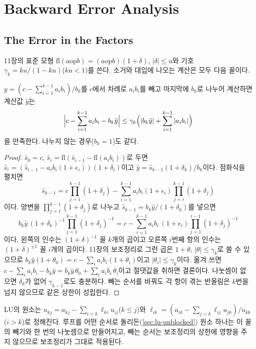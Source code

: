 \section{Backward Error Analysis}
\label{sec:lu-backward-error}

\subsection{The Error in the Factors}

11장의 표준 모형 $\mathrm{fl}(a\mathbin{\mathrm{op}}b)=(a\mathbin{\mathrm{op}}b)(1+\delta)$, $|\delta|\le u$와 기호 $\gamma_k=ku/(1-ku)$($ku<1$)를 쓴다. 소거와 대입에 나오는 계산은 모두 다음 꼴이다.

\begin{lemma}
\label{lem:lu-recurrence}
$y=(c-\sum_{i=1}^{k-1}a_ib_i)/b_k$를 $c$에서 차례로 $a_ib_i$를 빼고 마지막에 $b_k$로 나누어 계산하면 계산값 $\hat y$는
\[
\Bigl|c-\sum_{i=1}^{k-1}a_ib_i-b_k\hat y\Bigr|\le\gamma_k\Bigl(|b_k\hat y|+\sum_{i=1}^{k-1}|a_ib_i|\Bigr)
\]
을 만족한다. 나누지 않는 경우($b_k=1$)도 같다.
\end{lemma}

\begin{proof}
$\hat s_0=c$, $\hat s_i=\mathrm{fl}(\hat s_{i-1}-\mathrm{fl}(a_ib_i))$로 두면 $\hat s_i=(\hat s_{i-1}-a_ib_i(1+\epsilon_i))(1+\delta_i)$이고 $\hat y=\hat s_{k-1}(1+\delta_k)/b_k$이다. 점화식을 펼치면
\[
\hat s_{k-1}=c\prod_{j=1}^{k-1}(1+\delta_j)-\sum_{i=1}^{k-1}a_ib_i(1+\epsilon_i)\prod_{j=i}^{k-1}(1+\delta_j)
\]
이다. 양변을 $\prod_{j=1}^{k-1}(1+\delta_j)$로 나누고 $\hat s_{k-1}=b_k\hat y/(1+\delta_k)$를 넣으면
\[
b_k\hat y\,(1+\delta_k)^{-1}\prod_{j=1}^{k-1}(1+\delta_j)^{-1}=c-\sum_{i=1}^{k-1}a_ib_i\,(1+\epsilon_i)\prod_{j=1}^{i-1}(1+\delta_j)^{-1}
\]
이다. 왼쪽의 인수는 $(1+\delta)^{-1}$ 꼴 $k$개의 곱이고 오른쪽 $i$번째 항의 인수는 $(1+\delta)^{\pm1}$ 꼴 $i$개의 곱이다. 11장의 보조정리로 그런 곱은 $1+\theta$, $|\theta|\le\gamma_k$로 쓸 수 있으므로 $b_k\hat y(1+\theta_0)=c-\sum_ia_ib_i(1+\theta_i)$이고 $|\theta_i|\le\gamma_k$이다. 옮겨 쓰면 $c-\sum_ia_ib_i-b_k\hat y=b_k\hat y\,\theta_0+\sum_ia_ib_i\,\theta_i$이고 절댓값을 취하면 결론이다. 나눗셈이 없으면 $\delta_k$가 없어 $\gamma_{k-1}$로도 충분하다. 빼는 순서를 바꿔도 각 항이 겪는 반올림은 $k$번을 넘지 않으므로 같은 상한이 성립한다.
\end{proof}

LU의 원소는 $u_{kj}=a_{kj}-\sum_{i<k}\ell_{ki}u_{ij}$($k\le j$)와 $\ell_{ik}=(a_{ik}-\sum_{j<k}\ell_{ij}u_{jk})/u_{kk}$($i>k$)로 정해진다. 루프를 어떤 순서로 돌리든(\cref{sec:lu-unblocked}) 원소 하나는 이 꼴의 빼기와 한 번의 나눗셈으로 만들어지고, 빼는 순서는 보조정리의 상한에 영향을 주지 않으므로 보조정리가 그대로 적용된다.

